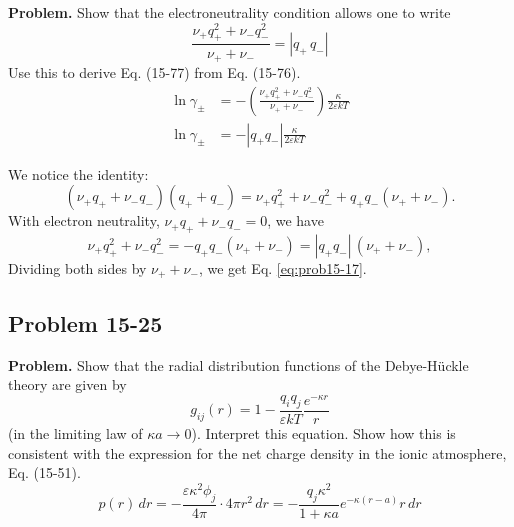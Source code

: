 \documentclass[twocolumn, 10pt]{article}
\numberwithin{equation}{section}
\newenvironment{problem}
{\par\medskip \color{problemblue}
  \textbf{Problem. }\ignorespaces}
{\medskip}
\newenvironment{solution}[1][\empty]
{\par\medskip\sffamily
  \textbf{\ifx\empty#1{Solution.}\relax\else{#1}\fi} \ignorespaces}
{\medskip}
\begin{document}
\begin{problem}
  Show that the electroneutrality condition allows one to write
  \begin{equation}
  \frac{ \nu_+ q_+^2 + \nu_- q_-^2 }
   { \nu_+ + \nu_- }
  =
  |q_+ \, q_-|
    \label{eq:prob15-17}
  \end{equation}
  Use this to derive Eq. (15-77) from Eq. (15-76).
  \begin{align}
    \ln \gamma_\pm
    &=
    -
    \left(
    \frac{ \nu_+ q_+^2 + \nu_- q_-^2 }
    { \nu_+ + \nu_- }
    \right)
    \frac{ \kappa } { 2 \varepsilon k T }
    \tag{15-76}
    \\
    \ln \gamma_\pm
    &=
    -|q_+ q_-|
    \frac{ \kappa } { 2 \varepsilon k T }
    \tag{15-77}
  \end{align}
\end{problem}

\begin{solution}
  We notice the identity:
  $$
  (\nu_+ q_+ + \nu_- q_-) (q_+ + q_-)
  =
  \nu_+ q_+^2 + \nu_- q_-^2
  +
  q_+ q_- (\nu_+ + \nu_-).
  $$
  With electron neutrality,
  $\nu_+ q_+ + \nu_- q_- = 0$,
  we have
  $$
  \nu_+ q_+^2 + \nu_- q_-^2
  =
  -q_+ q_- (\nu_+ + \nu_-)
  =
  |q_+ q_-| \, (\nu_+ + \nu_-)
  ,
  $$
  Dividing both sides by $\nu_+ + \nu_-$,
  we get Eq. \eqref{eq:prob15-17}.
\end{solution}

\subsection{Problem 15-25}

\begin{problem}
  Show that the radial distribution functions of the Debye-H\"uckle theory
  are given by
  \begin{equation}
  g_{ij}(r) = 1 - \frac{ q_i q_j } { \varepsilon k T } \frac{ e^{-\kappa r} } { r }
    \label{eq:gij_DH}
  \end{equation}
  (in the limiting law of $\kappa a \to 0$).
  Interpret this equation.
  Show how this is consistent with the expression for the net charge density
  in the ionic atmosphere, Eq. (15-51).
  \begin{equation}
    p(r) \, dr
    =
    -
    \frac{ \varepsilon \kappa^2 \phi_j } { 4 \pi } \cdot
    4 \pi r^2 \, dr
    =
    -
    \frac{ q_j \kappa^2 } { 1 + \kappa a }
    e^{-\kappa(r - a)} r \, dr
    \tag{15-51}
  \end{equation}
\end{problem}
\end{document}
